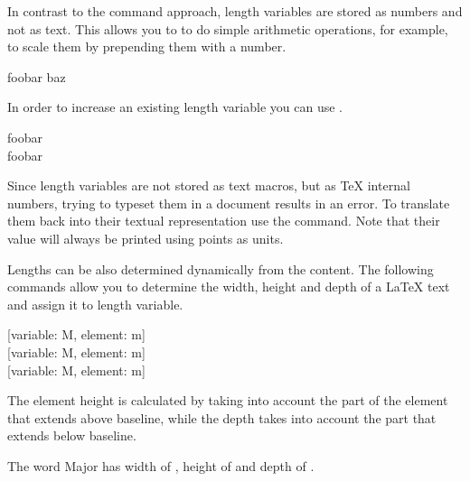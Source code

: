 In contrast to the command approach, length variables are stored as numbers and
not as text. This allows you to to do simple arithmetic operations, for
example, to scale them by prepending them with a number.
\begin{example}
\newlength{\mylength}
\setlength{\mylength}{2em}
foo\hspace{0.5\mylength}bar%
\hspace{2\mylength}baz
\end{example}
In order to increase an existing length variable you can use .
\begin{example}
\setlength{\mylength}{2em} %
foo\hspace{\mylength}bar\\
\addtolength{\mylength}{2em}
foo\hspace{\mylength}bar
\end{example}

Since length variables are not stored as text macros, but as \TeX{} internal
numbers, trying to typeset them in a document results in an error. To translate
them back into their textual representation use the  command. Note
that their value will always be printed using points as units.
\begin{chktexignore}
\begin{example}
\setlength{\mylength}{1cm}
\the\mylength
\end{example}
\end{chktexignore}

Lengths can be also determined dynamically from the content. The following
commands allow you to determine the width, height and depth of a \LaTeX{} text
and assign it to length variable.
\begin{lscommand}
  [variable: M, element: m]\\
  [variable: M, element: m] \\
  [variable: M, element: m]
\end{lscommand}
The element height is calculated by taking into account the part of the element
that extends above baseline, while the depth takes into account the part that
extends below baseline.
\begin{example}[vertical_mode, examplewidth=0.85\linewidth]
\newlength{\myheight} 
\newlength{\mydepth} 
\newlength{\mywidth} \settowidth{\mywidth}{Major}
The word Major has width of \the\mywidth, height of
\the\myheight{} and depth of \the\mydepth.
\end{example}

